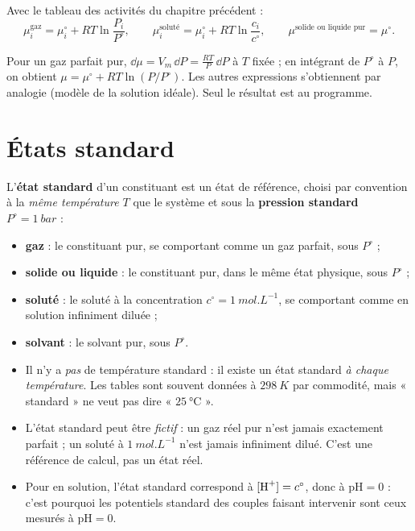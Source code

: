 Avec le tableau des activités du chapitre précédent :
\[ \mu_i^{\text{gaz}} = \mu_i^\circ + RT\ln\frac{P_i}{P^\circ}, \qquad \mu_i^{\text{soluté}} = \mu_i^\circ + RT\ln\frac{c_i}{c^\circ}, \qquad \mu^{\text{solide ou liquide pur}} = \mu^\circ. \]

\begin{horsprog}
Pour un gaz parfait pur, $\dd\mu = V_m\,\dd P = \frac{RT}{P}\,\dd P$ à $T$ fixée ; en intégrant de $P^\circ$ à $P$, on obtient $\mu = \mu^\circ + RT\ln(P/P^\circ)$. Les autres expressions s'obtiennent par analogie (modèle de la solution idéale). Seul le résultat est au programme.
\end{horsprog}

\section{États standard}

\begin{definition}
L'\textbf{état standard} d'un constituant est un état de référence, choisi par convention à la \emph{même température $T$} que le système et sous la \textbf{pression standard} $P^\circ = \SI{1}{bar}$ :
\begin{itemize}
  \item \textbf{gaz} : le constituant pur, se comportant comme un gaz parfait, sous $P^\circ$ ;
  \item \textbf{solide ou liquide} : le constituant pur, dans le même état physique, sous $P^\circ$ ;
  \item \textbf{soluté} : le soluté à la concentration $c^\circ = \SI{1}{mol.L^{-1}}$, se comportant comme en solution infiniment diluée ;
  \item \textbf{solvant} : le solvant pur, sous $P^\circ$.
\end{itemize}
\end{definition}

\begin{pieges}
\begin{itemize}
  \item Il n'y a \emph{pas} de température standard : il existe un état standard \emph{à chaque température}. Les tables sont souvent données à $\SI{298}{K}$ par commodité, mais « standard » ne veut pas dire « $\SI{25}{\celsius}$ ».
  \item L'état standard peut être \emph{fictif} : un gaz réel pur n'est jamais exactement parfait ; un soluté à $\SI{1}{mol.L^{-1}}$ n'est jamais infiniment dilué. C'est une référence de calcul, pas un état réel.
  \item Pour  en solution, l'état standard correspond à $[\ce{H+}] = c^\circ$, donc à $\mathrm{pH} = 0$ : c'est pourquoi les potentiels standard des couples faisant intervenir  sont ceux mesurés à $\mathrm{pH} = 0$.
\end{itemize}
\end{pieges}

